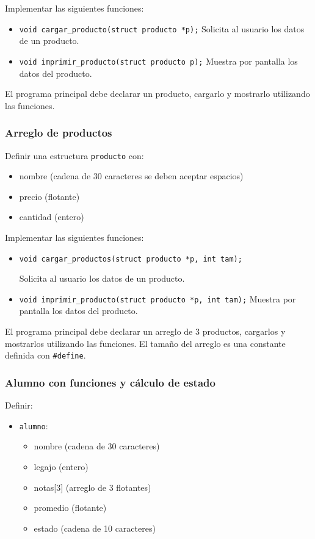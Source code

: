 Implementar las siguientes funciones:

\begin{itemize}
\item \texttt{void cargar\_producto(struct producto *p);}
Solicita al usuario los datos de un producto.
\item \texttt{void imprimir\_producto(struct producto p);}
Muestra por pantalla los datos del producto.
\end{itemize}

El programa principal debe declarar un producto, cargarlo y mostrarlo utilizando las funciones.

\subsubsection{Arreglo de productos}
Definir una estructura \texttt{producto} con:

\begin{itemize}
\item nombre (cadena de 30 caracteres se deben aceptar espacios)
\item precio (flotante)
\item cantidad (entero)
\end{itemize}

Implementar las siguientes funciones:

\begin{itemize}
\item \texttt{void cargar\_productos(struct producto *p, int tam);}

Solicita al usuario los datos de un producto.

\item \texttt{void imprimir\_producto(struct producto *p, int tam);}
Muestra por pantalla los datos del producto.
\end{itemize}

El programa principal debe declarar un arreglo de 3 productos, cargarlos y mostrarlos utilizando las funciones.
El tamaño del arreglo es una constante definida con \texttt{\#define}.

\subsubsection{Alumno con funciones y cálculo de estado}

Definir:

\begin{itemize}
\item \texttt{alumno}:
\begin{itemize}
\item nombre (cadena de 30 caracteres)
\item legajo (entero)
\item notas[3] (arreglo de 3 flotantes)
\item promedio (flotante)
\item estado (cadena de 10 caracteres)
\end{itemize}
\end{itemize}

